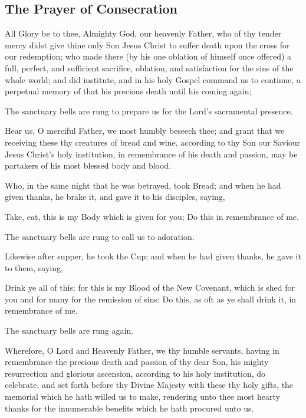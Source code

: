 \subsection{The Prayer of Consecration}

All Glory be to thee, Almighty God, our heavenly Father, who of thy
tender mercy didst give thine only Son Jesus Christ to suffer death upon the
cross for our redemption; who made there (by his one oblation of himself
once offered) a full, perfect, and sufficient sacrifice, oblation, and satisfaction
for the sins of the whole world; and did institute, and in his holy Gospel
command us to continue, a perpetual memory of that his precious death until his coming again;

\begin{rubric}
The sanctuary bells are rung to prepare us for the Lord's sacramental presence.
\end{rubric}

Hear us, O merciful Father, we most humbly beseech thee; and grant that we
receiving these thy creatures of bread and wine, according to thy Son our
Saviour Jesus Christ's holy institution, in remembrance of his death and
passion, may be partakers of his most blessed body and blood.

Who, in the same night that he was betrayed, took Bread; and when he had
given thanks, he brake it, and gave it to his disciples, saying,

Take, eat, this is my Body which is given for you; Do this in remembrance of me. \cross

\begin{rubric}
The sanctuary bells are rung to call us to adoration.
\end{rubric}

\newpage

Likewise after supper, he took the Cup; and when he had given thanks, he gave it to them, saying,

Drink ye all of this; for this is my Blood of the New Covenant,
which is shed for you and for many for the remission of sins:
Do this, as oft as ye shall drink it, in remembrance of me. \cross

\begin{rubric}
The sanctuary bells are rung again.
\end{rubric}

Wherefore, O Lord and Heavenly Father, we thy humble
servants, having in remembrance the precious death and passion of thy dear
Son, his mighty resurrection and glorious ascension, according to his holy
institution, do celebrate, and set forth before thy Divine Majesty with these thy
holy gifts, the memorial which he hath willed us to make, rendering unto thee
most hearty thanks for the innumerable benefits which he hath procured unto us.

